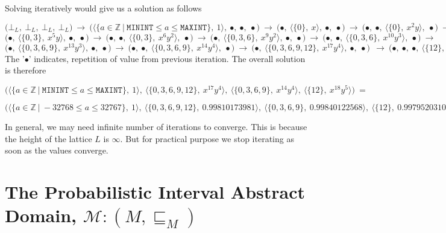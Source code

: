 \documentclass[final,3p, review, times]{util/elsarticle}
\begin{document}
Solving iteratively would give us a solution as follows

\noindent
$
\bigg(\bot_L,\ \bot_L,\ \bot_L,\ \bot_L\bigg)\ \to\ 
\bigg(\Big\langle\Big\{a\in\mathbb{Z}\ \big|\ \mathtt{MININT}\leq a\leq\mathtt{MAXINT}\Big\},\ 1\Big\rangle,\ \bullet,\ \bullet,\ \bullet\bigg)\ \to\ 
\bigg(\bullet,\ \Big\langle\Big\{0\Big\},\ x\Big\rangle,\ \bullet,\ \bullet\bigg)\ \to\ \bigg(\bullet,\ \bullet,\ \Big\langle\Big\{0\Big\},\ x^2y\Big\rangle,\ \bullet\bigg)\ \to
$\\
$
\bigg(\bullet,\ \Big\langle\Big\{0,3\Big\},\ x^5y\Big\rangle,\ \bullet,\ \bullet\bigg)\ \to\ \bigg(\bullet,\ \bullet,\ \Big\langle\Big\{0,3\Big\},\ x^6y^2\Big\rangle,\ \bullet\bigg)\ \to\ \bigg(\bullet,\ \Big\langle\Big\{0,3,6\Big\},\ x^9y^2\Big\rangle,\ \bullet,\ \bullet\bigg)\ \to\ \bigg(\bullet,\ \bullet,\ \Big\langle\Big\{0,3,6\Big\},\ x^{10}y^3\Big\rangle,\ \bullet\bigg)\ \to\ 
$\\
$
\bigg(\bullet,\ \Big\langle\Big\{0,3,6,9\Big\},\ x^{13}y^3\Big\rangle,\ \bullet,\ \bullet\bigg)\ \to\ \bigg(\bullet,\ \bullet,\ \Big\langle\Big\{0,3,6,9\Big\},\ x^{14}y^4\Big\rangle,\ \bullet\bigg)\ \to\ \bigg(\bullet,\ \Big\langle\Big\{0,3,6,9,12\Big\},\ x^{17}y^4\Big\rangle,\ \bullet,\ \bullet\bigg)\ \ \to\ \bigg(\bullet,\ \bullet,\ \bullet,\ \Big\langle\Big\{12\Big\},\ x^{18}y^5\Big\rangle\bigg)
$\\
       
The '$\bullet$' indicates, repetition of value from previous iteration. The overall solution is therefore

\noindent$\bigg(\Big\langle\Big\{a\in\mathbb{Z}\ \big|\ \mathtt{MININT}\leq a\leq\mathtt{MAXINT}\Big\},\ 1\Big\rangle,\ \Big\langle\Big\{0,3,6,9,12\Big\},\ x^{17}y^4\Big\rangle,\ \Big\langle\Big\{0,3,6,9\Big\},\ x^{14}y^4\Big\rangle,\ \Big\langle\Big\{12\Big\},\ x^{18}y^5\Big\rangle\bigg)\ =$

\noindent$\bigg(\Big\langle\Big\{a\in\mathbb{Z}\ \big|\ -32768\leq a\leq 32767\Big\},\ 1\Big\rangle,\ \Big\langle\Big\{0,3,6,9,12\Big\},\ 0.99810173981\Big\rangle,\ \Big\langle\Big\{0,3,6,9\Big\},\ 0.99840122568\Big\rangle,\ \Big\langle\Big\{12\Big\},\ 0.99795203106\Big\rangle\bigg)$

In general, we may need infinite number of iterations to converge. This is because the height of the lattice $L$ is $\infty$. But for practical purpose we stop iterating as soon as the values converge.

\section{The Probabilistic Interval Abstract Domain, $\mathcal{M}:(M,\sqsubseteq_M)$}
\end{document}

